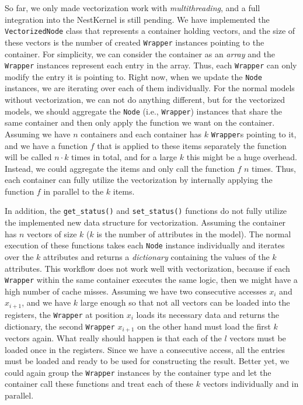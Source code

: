 So far, we only made vectorization work with \emph{multithreading}, and a full integration into the NestKernel is still pending. We have implemented the \texttt{VectorizedNode} class that represents a container holding vectors, and the size of these vectors is the number of created \texttt{Wrapper} instances pointing to the container. For simplicity, we can consider the container as an \emph{array} and the \texttt{Wrapper} instances represent each entry in the array. Thus, each \texttt{Wrapper} can only modify the entry it is pointing to. Right now, when we update the \texttt{Node} instances, we are iterating over each of them individually. For the normal models without vectorization, we can not do anything different, but for the vectorized models, we should aggregate the \texttt{Node} (i.e., \texttt{Wrapper}) instances that share the same container and then only apply the function we want on the container. Assuming we have $n$ containers and each container has $k$ \texttt{Wrapper}s pointing to it, and we have a function $f$ that is applied to these items separately the function will be called $n\cdot k$ times in total, and for a large $k$ this might be a huge overhead. Instead, we could aggregate the items and only call the function $f$ $n$ times. Thus, each container can fully utilize the vectorization by internally applying the function $f$ in parallel to the $k$ items.

In addition, the \texttt{get\_status()} and \texttt{set\_status()} functions do not fully utilize the implemented new data structure for vectorization. Assuming the container has $n$ vectors of size $k$ ($k$ is the number of attributes in the model). The normal execution of these functions takes each \texttt{Node} instance individually and iterates over the $k$ attributes and returns a \emph{dictionary} containing the values of the $k$ attributes. This workflow does not work well with vectorization, because if each \texttt{Wrapper} within the same container executes the same logic, then we might have a high number of cache misses. Assuming we have two consecutive accesses $x_i$ and $x_{i+1}$, and we have $k$ large enough so that not all vectors can be loaded into the registers, the \texttt{Wrapper} at position $x_i$ loads its necessary data and returns the dictionary, the second \texttt{Wrapper} $x_{i+1}$ on the other hand must load the first $k$ vectors again. What really should happen is that each of the $l$ vectors must be loaded once in the registers. Since we have a consecutive access, all the entries must be loaded and ready to be used for constructing the result. Better yet, we could again group the \texttt{Wrapper} instances by the container type and let the container call these functions and treat each of these $k$ vectors individually and in parallel.

\cleardoublepage
